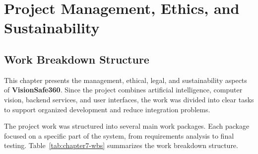 \chapter{Project Management, Ethics, and Sustainability}

\section{Work Breakdown Structure}

This chapter presents the management, ethical, legal, and sustainability aspects of \textbf{VisionSafe360}. Since the project combines artificial intelligence, computer vision, backend services, and user interfaces, the work was divided into clear tasks to support organized development and reduce integration problems.

The project work was structured into several main work packages. Each package focused on a specific part of the system, from requirements analysis to final testing. Table~\ref{tab:chapter7-wbs} summarizes the work breakdown structure.

